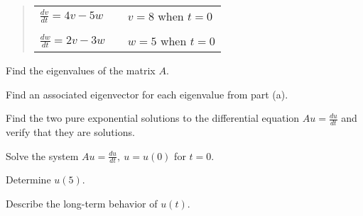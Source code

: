 \documentclass[minion]{homework}
\begin{document}
\begin{problems}
\begin{quote}
\begin{tabular}{lll}
$\frac{dv}{dt}=4v-5w$&\quad& $v=8$ when $t=0$\\
&&\\
$\frac{dw}{dt}=2v-3w$&\quad& $w=5$ when $t=0$\\
\end{tabular}
\end{quote}
	\begin{subproblems}
	\item Find the eigenvalues of the matrix $A.$
	\item Find an associated eigenvector for each eigenvalue from part (a).
	\item Find the two pure exponential solutions to the differential equation $Au=\frac{du}{dt}$ and verify that they are solutions.
	\item Solve the system $Au=\frac{du}{dt}, \: u=u(0)$ for $t=0.$
	\item Determine $u(5).$
	\item Describe the long-term behavior of $u(t).$
	\end{subproblems}

\end{problems}
\end{document}
